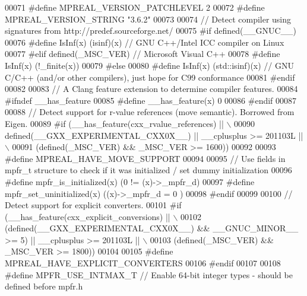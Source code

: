 \begin{DoxyCode}
00071 \textcolor{preprocessor}{#define MPREAL\_VERSION\_PATCHLEVEL 2}
00072 \textcolor{preprocessor}{#define MPREAL\_VERSION\_STRING "3.6.2"}
00073 
00074 \textcolor{comment}{// Detect compiler using signatures from http://predef.sourceforge.net/}
00075 \textcolor{preprocessor}{#if defined(\_\_GNUC\_\_)}
00076 \textcolor{preprocessor}{    #define IsInf(x) (isinf)(x)                 // GNU C++/Intel ICC compiler on Linux}
00077 \textcolor{preprocessor}{#elif defined(\_MSC\_VER)                         // Microsoft Visual C++}
00078 \textcolor{preprocessor}{    #define IsInf(x) (!\_finite(x))}
00079 \textcolor{preprocessor}{#else}
00080 \textcolor{preprocessor}{    #define IsInf(x) (std::isinf)(x)              // GNU C/C++ (and/or other compilers), just hope for C99
       conformance}
00081 \textcolor{preprocessor}{#endif}
00082 
00083 \textcolor{comment}{// A Clang feature extension to determine compiler features.}
00084 \textcolor{preprocessor}{#ifndef \_\_has\_feature}
00085 \textcolor{preprocessor}{    #define \_\_has\_feature(x) 0}
00086 \textcolor{preprocessor}{#endif}
00087 
00088 \textcolor{comment}{// Detect support for r-value references (move semantic). Borrowed from Eigen.}
00089 \textcolor{preprocessor}{#if (\_\_has\_feature(cxx\_rvalue\_references) || \(\backslash\)}
00090 \textcolor{preprocessor}{       defined(\_\_GXX\_EXPERIMENTAL\_CXX0X\_\_) || \_\_cplusplus >= 201103L || \(\backslash\)}
00091 \textcolor{preprocessor}{      (defined(\_MSC\_VER) && \_MSC\_VER >= 1600))}
00092 
00093 \textcolor{preprocessor}{    #define MPREAL\_HAVE\_MOVE\_SUPPORT}
00094 
00095     \textcolor{comment}{// Use fields in mpfr\_t structure to check if it was initialized / set dummy initialization}
00096 \textcolor{preprocessor}{    #define mpfr\_is\_initialized(x)      (0 != (x)->\_mpfr\_d)}
00097 \textcolor{preprocessor}{    #define mpfr\_set\_uninitialized(x)   ((x)->\_mpfr\_d = 0 )}
00098 \textcolor{preprocessor}{#endif}
00099 
00100 \textcolor{comment}{// Detect support for explicit converters.}
00101 \textcolor{preprocessor}{#if (\_\_has\_feature(cxx\_explicit\_conversions) || \(\backslash\)}
00102 \textcolor{preprocessor}{       (defined(\_\_GXX\_EXPERIMENTAL\_CXX0X\_\_) && \_\_GNUC\_MINOR\_\_ >= 5) || \_\_cplusplus >= 201103L || \(\backslash\)}
00103 \textcolor{preprocessor}{       (defined(\_MSC\_VER) && \_MSC\_VER >= 1800))}
00104 
00105 \textcolor{preprocessor}{    #define MPREAL\_HAVE\_EXPLICIT\_CONVERTERS}
00106 \textcolor{preprocessor}{#endif}
00107 
00108 \textcolor{preprocessor}{#define MPFR\_USE\_INTMAX\_T   // Enable 64-bit integer types - should be defined before mpfr.h}

\end{DoxyCode}
